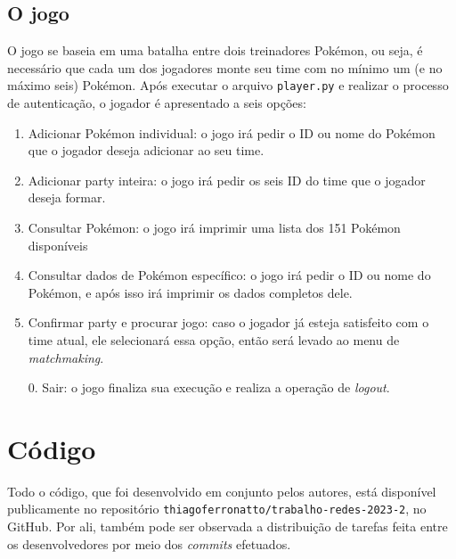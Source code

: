 \documentclass{article}
\begin{document}
\begin{multicols}{2}
    \subsection{O jogo}
    O jogo se baseia em uma batalha entre dois treinadores Pokémon, ou seja, é necessário que cada um dos jogadores monte seu time com no mínimo um (e no máximo seis) Pokémon.
    Após executar o arquivo \texttt{player.py} e realizar o processo de autenticação, o jogador é apresentado a seis opções:
    \begin{enumerate}
        \item Adicionar Pokémon individual: o jogo irá pedir o ID ou nome do Pokémon que o jogador deseja adicionar ao seu time.        
        \item Adicionar party inteira: o jogo irá pedir os seis ID do time que o jogador deseja formar.
        \item Consultar Pokémon: o jogo irá imprimir uma lista dos 151 Pokémon disponíveis
        \item Consultar dados de Pokémon específico: o jogo irá pedir o ID ou nome do Pokémon, e após isso irá imprimir os dados completos dele.
        \item Confirmar party e procurar jogo: caso o jogador já esteja satisfeito com o time atual, ele selecionará essa opção, então será levado ao menu de \textit{matchmaking}.
        \item[0.] Sair: o jogo finaliza sua execução e realiza a operação de  \textit{logout}.
    \end{enumerate}
    
    \section{Código}
    
    Todo o código, que foi desenvolvido em conjunto pelos autores, está disponível publicamente no repositório \texttt{thiagoferronatto/trabalho-redes-2023-2}, no GitHub. Por ali, também pode ser observada a distribuição de tarefas feita entre os desenvolvedores por meio dos \textit{commits} efetuados.
  \end{multicols}
\end{document}
